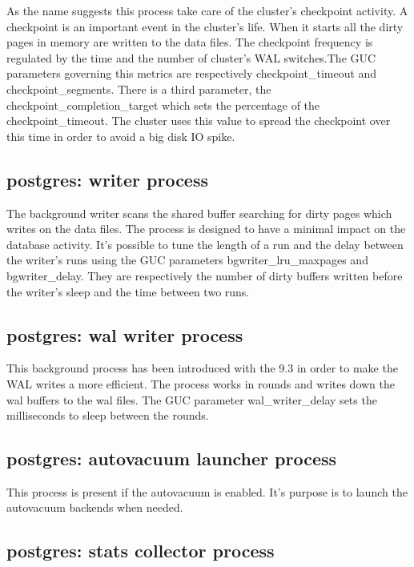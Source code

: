 As the name suggests this process take care of the cluster's
checkpoint activity. A checkpoint is an important event in
the cluster's life. When it starts all the dirty pages in memory are written to
the data files. The checkpoint frequency is regulated by the time and the
number of cluster's WAL switches.The GUC parameters governing this metrics are
respectively checkpoint\_timeout and
checkpoint\_segments. There is a third parameter,
the checkpoint\_completion\_target which
sets the percentage of the checkpoint\_timeout. The cluster uses this value to
spread the checkpoint over this time in order to avoid a big disk IO spike.

\subsection{postgres: writer process}

The background writer scans the shared buffer searching for dirty pages which
writes on the data files. The process is designed to have a minimal impact on
the database activity. It's possible to tune the length of a run and the delay
between the writer's runs using the GUC parameters
bgwriter\_lru\_maxpages and
bgwriter\_delay. They are respectively the number of
dirty buffers written before the writer's sleep and the time between two runs.

\subsection{postgres: wal writer process}

This background process has been introduced with the 9.3 in order to make the
WAL writes a more efficient. The process works in rounds and writes down the
wal buffers to the wal files. The GUC parameter
wal\_writer\_delay sets the milliseconds to sleep
between the rounds.

\subsection{postgres: autovacuum launcher process}

This process is present if the autovacuum is enabled. It's
purpose is to launch the autovacuum backends when needed.

\subsection{postgres: stats collector process}

